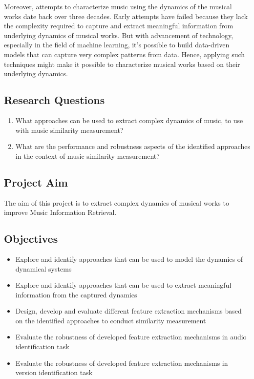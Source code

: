 \documentclass[../main.tex]{subfiles}
\begin{document}
\par
Moreover, attempts to characterize music using the dynamics of the musical works date back over three decades. Early attempts have failed because they lack the complexity required to capture and extract meaningful information from underlying dynamics of musical works. But with advancement of technology, especially in the field of machine learning, it's possible to build data-driven models that can capture very complex patterns from data. Hence, applying such techniques might make it possible to characterize musical works based on their underlying dynamics.


\subsection{Research Questions}

\normalsize
\begin{enumerate}
  \item What approaches can be used to extract complex dynamics of music, to use with music similarity measurement?
  \item What are the performance and robustness aspects of the identified approaches in the context of music similarity measurement?
\end{enumerate}

\subsection{Project Aim}
The aim of this project is to extract complex dynamics of musical works to improve Music Information Retrieval.


\subsection{Objectives}
\begin{itemize}
  \item Explore and identify approaches that can be used to model the dynamics of dynamical systems
  \item Explore and identify approaches that can be used to extract meaningful information from the captured dynamics
  \item Design, develop and evaluate different feature extraction mechanisms based on the identified approaches to conduct similarity measurement
  \item Evaluate the robustness of developed feature extraction mechanisms in audio identification task
  \item Evaluate the robustness of developed feature extraction mechanisms in version identification task
\end{itemize}
\end{document}
